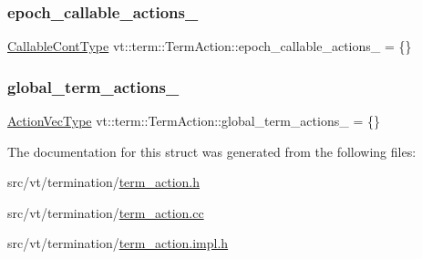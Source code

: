 \subsubsection{\texorpdfstring{epoch\+\_\+callable\+\_\+actions\+\_\+}{epoch\_callable\_actions\_}}
{\footnotesize\ttfamily \hyperlink{structvt_1_1term_1_1_term_action_a802aaa899ce87dc9f8a53d43b202044c}{Callable\+Cont\+Type} vt\+::term\+::\+Term\+Action\+::epoch\+\_\+callable\+\_\+actions\+\_\+ = \{\}\hspace{0.3cm}{\ttfamily [protected]}}

\mbox{\label{structvt_1_1term_1_1_term_action_a2afe34a3835ba57d79d0d1754bbb321e}} 
\subsubsection{\texorpdfstring{global\+\_\+term\+\_\+actions\+\_\+}{global\_term\_actions\_}}
{\footnotesize\ttfamily \hyperlink{structvt_1_1term_1_1_term_action_a76d94f79a48ba8367b68f9188784da88}{Action\+Vec\+Type} vt\+::term\+::\+Term\+Action\+::global\+\_\+term\+\_\+actions\+\_\+ = \{\}\hspace{0.3cm}{\ttfamily [protected]}}



The documentation for this struct was generated from the following files\+:\begin{DoxyCompactItemize}
\item 
src/vt/termination/\hyperlink{term__action_8h}{term\+\_\+action.\+h}\item 
src/vt/termination/\hyperlink{term__action_8cc}{term\+\_\+action.\+cc}\item 
src/vt/termination/\hyperlink{term__action_8impl_8h}{term\+\_\+action.\+impl.\+h}\end{DoxyCompactItemize}
